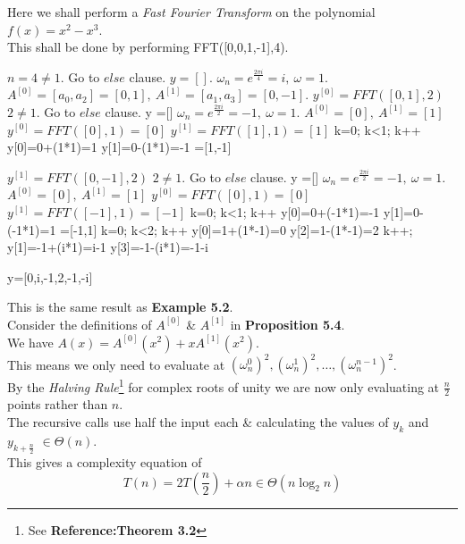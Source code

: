 \documentclass[11pt,a4paper]{article}
\begin{document}
Here we shall perform a \textit{Fast Fourier Transform} on the polynomial $f(x)=x^2-x^3$.\\
This shall be done by performing FFT([0,0,1,-1],4).
\begin{code}
$n=4\neq1$. Go to $\textit{else}$ clause.
$y=[]$.
$\omega_n=e^{\frac{2\pi i}{4}}=i,\ \omega=1$.
$A^{[0]}=[a_0,a_2]=[0,1],\ A^{[1]}=[a_1,a_3]=[0,-1]$.
$y^{[0]}=FFT([0,1],2)$
     $2\neq1$. Go to $\textit{else}$ clause.
     y =[]
     $\omega_n=e^{\frac{2\pi i}{2}}=-1,\ \omega=1$.
     $A^{[0]}=[0],\ A^{[1]}=[1]$
     $y^{[0]}=FFT([0],1)=[0]$
     $y^{[1]}=FFT([1],1)=[1]$
     k=0; k<1; k++
     y[0]=0+(1*1)=1
     y[1]=0-(1*1)=-1
   =[1,-1]
\end{code}
\newpage
\begin{code}
$y^{[1]}=FFT([0,-1],2)$
     $2\neq1$. Go to $\textit{else}$ clause.
     y =[]
     $\omega_n=e^{\frac{2\pi i}{2}}=-1,\ \omega=1$.
     $A^{[0]}=[0],\ A^{[1]}=[1]$
     $y^{[0]}=FFT([0],1)=[0]$
     $y^{[1]}=FFT([-1],1)=[-1]$
     k=0; k<1; k++
     y[0]=0+(-1*1)=-1
     y[1]=0-(-1*1)=1
   =[-1,1]
k=0; k<2; k++
y[0]=1+(1*-1)=0
y[2]=1-(1*-1)=2
k++;
y[1]=-1+(i*1)=i-1
y[3]=-1-(i*1)=-1-i

y=[0,i,-1,2,-1,-i]
\end{code}
\nb This is the same result as \textbf{Example 5.2}.\\

Consider the definitions of $A^{[0]}$ \& $A^{[1]}$ in \textbf{Proposition 5.4}.\\
We have $A(x)=A^{[0]}(x^2)+xA^{[1]}(x^2)$.\\
This means we only need to evaluate at $(\omega_n^0)^2,(\omega_n^1)^2, \dots, (\omega_n^{n-1})^2$.\\
By the \textit{Halving Rule}\footnote{See \textbf{Reference:Theorem 3.2}} for complex roots of unity we are now only evaluating at $\frac{n}{2}$ points rather than $n$.\\

The recursive calls use half the input each \& calculating the values of $y_k$ and $y_{k+\frac{n}{2}}$ $\in\Theta(n)$.\\
This gives a complexity equation of
$$T(n)=2T\left(\frac{n}{2}\right)+\alpha n\in\Theta(n\log_2n)$$
\end{document}
